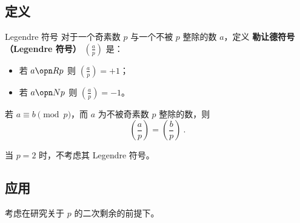 
\subsection{定义}
\begin{definition}{Legendre 符号}
对于一个奇素数 $p$ 与一个不被 $p$ 整除的数 $a$，定义 \textbf{勒让德符号（Legendre 符号）} $\left( \frac{a}{p} \right)$ 是：
\begin{itemize}
\item 若 $a \opn R p$ 则 $\left( \frac{a}{p} \right) = +1$；
\item 若 $a \opn N p$ 则 $\left( \frac{a}{p} \right) = -1$。
\end{itemize}
\end{definition}

\begin{corollary}{}
若 $a \equiv b \pmod p$，而 $a$ 为不被奇素数 $p$ 整除的数，则
\begin{equation}
\left(\frac ap \right) = \left(\frac bp \right) ~.
\end{equation}

\end{corollary}

当 $p=2$ 时，不考虑其 Legendre 符号。

\subsection{应用}
考虑在研究关于 $p$ 的二次剩余的前提下。

